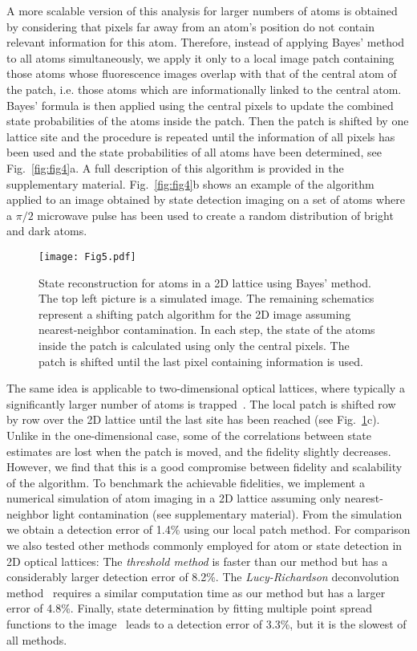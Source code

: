 \documentclass[aps,prl,twocolumn,english,showpacs]{revtex4-1}
\begin{document}
A more scalable version of this analysis for larger numbers of atoms is obtained by considering that pixels far away from an atom's position do not contain relevant information for this atom. Therefore, instead of applying Bayes' method to all atoms simultaneously, we apply it only to a local image patch containing those atoms whose fluorescence images overlap with that of the central atom of the patch, i.e. those atoms which are informationally linked to the central atom. Bayes' formula is then applied using the central pixels to update the combined state probabilities of the atoms inside the patch. Then the patch is shifted by one lattice site and the procedure is repeated until the information of all pixels has been used and the state probabilities of all atoms have been determined, see Fig.~\ref{fig:fig4}a. A full description of this algorithm is provided in the supplementary material. Fig.~\ref{fig:fig4}b shows an example of the algorithm applied to an image obtained by state detection imaging on a set of atoms where a $\pi/2$ microwave pulse has been used to create a random distribution of bright and dark atoms.


\begin{figure}[t]
		\texttt{[image: Fig5.pdf]}
  	\caption{State reconstruction for atoms in a 2D lattice using Bayes' method. The top left picture is a simulated image. The remaining schematics represent a shifting patch algorithm for the 2D image assuming nearest-neighbor contamination. In each step, the state of the atoms inside the patch is calculated using only the central pixels. The patch is shifted until the last pixel containing information is used.	
  	  	}  {\label{fig:fig5}}
\end{figure}

The same idea is applicable to two-dimensional optical lattices, where typically a significantly larger number of atoms is trapped~\cite{sherson2010,cheuk2015quantum,bakr2009,parsons2015site}. The local patch is shifted row by row over the 2D lattice until the last site has been reached (see Fig.~\ref{fig:fig5}c). Unlike in the one-dimensional case, some of the correlations between state estimates are lost when the patch is moved, and the fidelity slightly decreases. However, we find that this is a good compromise between fidelity and scalability of the algorithm. To benchmark the achievable fidelities, we implement a numerical simulation of atom imaging in a 2D lattice assuming only nearest-neighbor light contamination (see supplementary material). From the simulation we obtain a detection error of 1.4\% using our local patch method. For comparison we also tested other methods commonly employed for atom or state detection in 2D optical lattices: The \emph{threshold method} is faster than our method but has a considerably larger detection error of 8.2\%. The \emph{Lucy-Richardson} deconvolution method~\cite{boll2016spin} requires a similar computation time as our method but has a larger error of 4.8\%. Finally, state determination by fitting multiple point spread functions to the image~\cite{bakr2009} leads to a detection error of 3.3\%, but it is the slowest of all methods.
\end{document}
